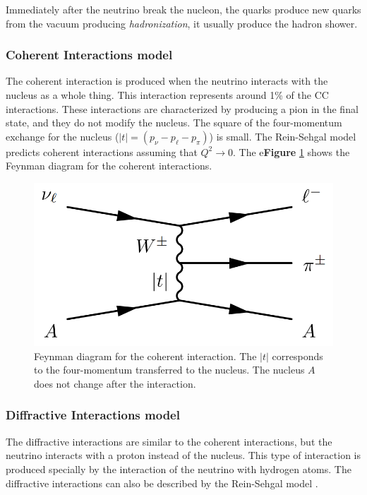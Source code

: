 Immediately after the neutrino break the nucleon, the quarks produce new quarks from the vacuum producing \textit{hadronization}, it usually produce the hadron shower. 
\subsubsection{Coherent Interactions model}
\label{Cap:Int:NuInteractions:Coherent}

The coherent interaction is produced when the neutrino interacts with the nucleus as a whole thing. This interaction represents around 1\% of the CC interactions. These interactions are characterized by producing a pion in the final state, and they do not modify the nucleus. The square of the four-momentum exchange for the nucleus ($|t|=(p_\nu-p_\ell-p_\pi)$) is small. The Rein-Sehgal model \cite{REINcoh198329} predicts coherent interactions assuming that $Q^2 \rightarrow 0$. The e\textbf{Figure} \ref{fig:Int:NuInteractions:Coherent} shows the Feynman diagram for the coherent interactions.


\begin{figure}[!htb]
    \centering
    \includegraphics[scale=0.3]{Figures/Chapter1/CoherentFeynman.png}
    \caption{Feynman diagram for the coherent interaction. The $|t|$ corresponds to the four-momentum transferred to the nucleus. The nucleus $A$ does not change after the interaction.}
    \label{fig:Int:NuInteractions:Coherent}
\end{figure}

\subsubsection{Diffractive Interactions model}
\label{Cap:Int:NuInteractions:Diffractive}

The diffractive interactions are similar to the coherent interactions, but the neutrino interacts with a proton instead of the nucleus. This type of interaction is produced specially by the interaction of the neutrino with hydrogen atoms. The diffractive interactions can also be described by the Rein-Sehgal model \cite{REINcoh198329}.

